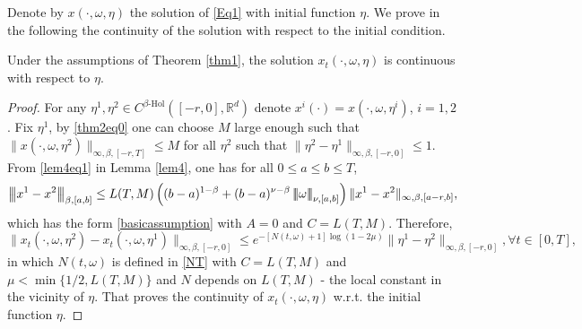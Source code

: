 \documentclass[graybox]{svmult}
\newcommand{\R}{\ensuremath{\mathbb{R}}}
\newcommand{\ltn}{\ensuremath{\left| \! \left| \! \left|}}
\newcommand{\rtn}{\ensuremath{\right| \! \right| \! \right|}}
\begin{document}
Denote by $x(\cdot,\omega,\eta)$ the solution of \eqref{Eq1} with initial function $\eta$. We prove in the following the continuity of the solution with respect to the initial condition.


\begin{theorem}\label{thm3}
	Under the assumptions of Theorem \ref{thm1}, the solution $x_t(\cdot,\omega,\eta)$ is continuous with respect to $\eta$.
\end{theorem}
\begin{proof}
	For any $\eta^1, \eta^2 \in C^{\beta\text{-Hol}}([-r,0],\R^d)$ denote $x^i(\cdot)=x(\cdot,\omega,\eta^i)$, $i=1,2$. Fix $\eta^1$, by \eqref{thm2eq0} one can choose $M$ large enough such that $\|x(\cdot,\omega,\eta^2)\|_{\infty,\beta,[-r,T]}\leq M$ for all $\eta^2$ such that $\|\eta^2 -\eta^1\|_{\infty,\beta,[-r,0]}\leq 1$. From \eqref{lem4eq1} in Lemma \ref{lem4}, one has for all $0\leq a\leq b\leq T$,
	\begin{eqnarray*}
		\ltn x^1 - x^2\rtn_{\beta,[a,b]} \leq  L(T,M)\left((b-a)^{1-\beta}+ (b-a)^{\nu-\beta}\ltn\omega\rtn_{\nu,[a,b]}\right) \|x^1-x^2\|_{\infty,\beta,[a-r,b]},
	\end{eqnarray*}
	which has the form \eqref{basicassumption} with $A=0$ and $C= L(T,M)$.
	Therefore,
	\[
	\|x_t(\cdot,\omega,\eta^2) - x_t(\cdot,\omega,\eta^1)\|_{\infty,\beta,[-r,0]}\leq e^{-[N(t,\omega)+1]\log(1-2\mu)} \|\eta^1 - \eta^2\|_{\infty,\beta,[-r,0]}, \forall t\in [0,T],
	\]
	in which $N(t,\omega)$ is defined in \eqref{NT} with $C= L(T,M)$ and $\mu < \min\{1/2, L(T,M)\}$
	and $N$ depends on $L(T,M)$ - the local constant in the vicinity of $\eta$. That proves the continuity of $x_t(\cdot,\omega,\eta)$ w.r.t. the initial function $\eta$.
\end{proof}
\end{document}

